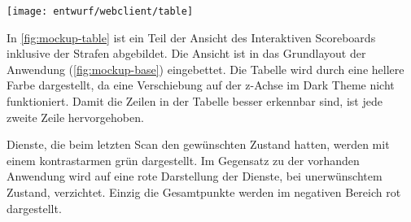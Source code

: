 \begin{center}
	\texttt{[image: entwurf/webclient/table]}
	\label{fig:mockup-table}
\end{center}

In \autoref{fig:mockup-table} ist ein Teil der Ansicht des Interaktiven Scoreboards inklusive der Strafen abgebildet. Die Ansicht ist in das Grundlayout der Anwendung (\autoref{fig:mockup-base}) eingebettet. Die Tabelle wird durch eine hellere Farbe dargestellt, da eine Verschiebung auf der z-Achse im Dark Theme nicht funktioniert. Damit die Zeilen in der Tabelle besser erkennbar sind, ist jede zweite Zeile hervorgehoben. 

Dienste, die beim letzten Scan den gewünschten Zustand hatten, werden mit einem kontrastarmen grün dargestellt. Im Gegensatz zu der vorhanden Anwendung wird auf eine rote Darstellung der Dienste, bei unerwünschtem Zustand, verzichtet. Einzig die Gesamtpunkte werden im negativen Bereich rot dargestellt.
